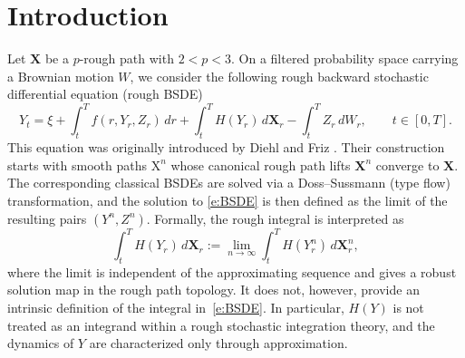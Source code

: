 \documentclass[11pt,reqno]{amsart}
\numberwithin{equation}{section}
\begin{document}
\maketitle
\tableofcontents


\section{Introduction}

Let $\mathbf X$ be a $p$-rough path with $2<p<3$. On a filtered probability
space carrying a Brownian motion $W$, we consider the following rough backward
stochastic differential equation (rough BSDE)
\begin{equation}\label{e:BSDE}
Y_{t}
=
\xi
+
\int_{t}^{T} f(r,Y_{r},Z_{r})\,dr
+
\int_{t}^{T} H(Y_{r})\,d\mathbf X_r
-
\int_{t}^{T} Z_r\,dW_r,
\qquad t\in[0,T].
\end{equation}
This equation was originally introduced by Diehl and Friz \cite{DF}. Their construction
starts with smooth paths $\mathrm X^n$ whose canonical rough path lifts
$\mathbf X^n$ converge to $\mathbf X$. The corresponding classical BSDEs are
solved via a Doss--Sussmann (type flow) transformation, and the solution to \eqref{e:BSDE} is then defined as the limit of the resulting pairs $(Y^n,Z^n)$.
Formally, the rough integral is interpreted as
\begin{equation}\label{e:approximate rough integral}
\int_t^T H(Y_r)\,d\mathbf X_r
:=
\lim_{n\to\infty}
\int_t^T H(Y^n_r)\,d\mathbf X^n_r,
\end{equation}
where the limit is independent of the approximating sequence and gives a robust
solution map in the rough path topology. It does not, however, provide an
intrinsic definition of the integral in~\eqref{e:BSDE}. In particular,
$H(Y)$ is not treated as an integrand within a rough stochastic integration
theory, and the dynamics of $Y$ are characterized only through approximation.
\end{document}
